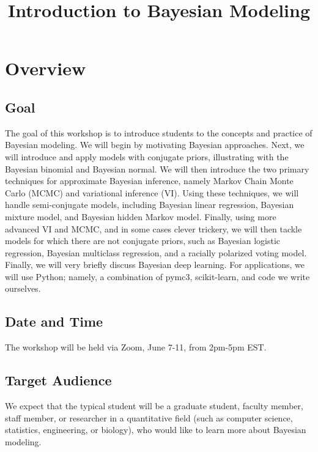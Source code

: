 \documentclass{article} %
\begin{document}
\title{Introduction to Bayesian Modeling} 

\maketitle

\tableofcontents
\newpage

\section{Overview}

\subsection{Goal}  The goal of this workshop is to introduce students to the concepts and practice of Bayesian modeling.   We will begin by motivating Bayesian approaches.  Next,  we will introduce and apply models with conjugate priors,  illustrating with the Bayesian binomial and Bayesian normal.   We will then introduce the two primary techniques for approximate Bayesian inference,  namely Markov Chain Monte Carlo (MCMC) and variational inference (VI).  Using these techniques, we will handle semi-conjugate models, including Bayesian linear regression, Bayesian mixture model,  and Bayesian hidden Markov model.   Finally, using more advanced VI and MCMC,  and in some cases clever trickery,  we will then tackle models for which there are not conjugate priors,  such as Bayesian logistic regression, Bayesian multiclass regression, and a racially polarized voting model.   Finally,  we will very briefly discuss Bayesian deep learning.    For applications,  we will use Python; namely,  a combination of  pymc3,  scikit-learn,  and code we write ourselves.  
 
\subsection{Date and Time}  The workshop will be held via Zoom,  June 7-11,  from 2pm-5pm EST.   
 
\subsection{Target Audience}  We expect that the typical student will be a graduate student, faculty member, staff member, or researcher in a quantitative field (such as computer science,  statistics,  engineering, or biology),  who would like to learn more about Bayesian modeling.  
\end{document}
